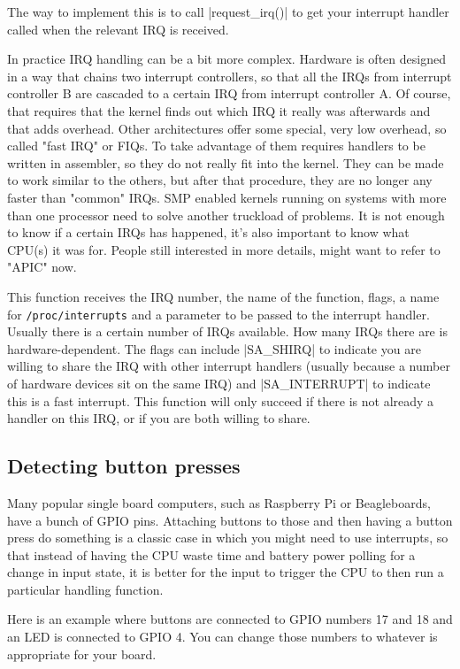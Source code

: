 \documentclass[10pt, oneside]{book}
\begin{document}
The way to implement this is to call \cpp|request_irq()| to get your interrupt handler called when the relevant IRQ is received.

In practice IRQ handling can be a bit more complex.
Hardware is often designed in a way that chains two interrupt controllers, so that all the IRQs from interrupt controller B are cascaded to a certain IRQ from interrupt controller A.
Of course, that requires that the kernel finds out which IRQ it really was afterwards and that adds overhead. Other architectures offer some special, very low overhead, so called "fast IRQ" or FIQs.
To take advantage of them requires handlers to be written in assembler, so they do not really fit into the kernel.
They can be made to work similar to the others, but after that procedure, they are no longer any faster than "common" IRQs.
SMP enabled kernels running on systems with more than one processor need to solve another truckload of problems.
It is not enough to know if a certain IRQs has happened, it's also important to know what CPU(s) it was for.
People still interested in more details, might want to refer to "APIC" now.

This function receives the IRQ number, the name of the function, flags, a name for \verb|/proc/interrupts| and a parameter to be passed to the interrupt handler.
Usually there is a certain number of IRQs available.
How many IRQs there are is hardware-dependent.
The flags can include \cpp|SA_SHIRQ| to indicate you are willing to share the IRQ with other interrupt handlers (usually because a number of hardware devices sit on the same IRQ) and \cpp|SA_INTERRUPT| to indicate this is a fast interrupt.
This function will only succeed if there is not already a handler on this IRQ, or if you are both willing to share.

\subsection{Detecting button presses}
\label{sec:detect_button}
Many popular single board computers, such as Raspberry Pi or Beagleboards, have a bunch of GPIO pins.
Attaching buttons to those and then having a button press do something is a classic case in which you might need to use interrupts,
so that instead of having the CPU waste time and battery power polling for a change in input state, it is better for the input to trigger the CPU to then run a particular handling function.

Here is an example where buttons are connected to GPIO numbers 17 and 18 and an LED is connected to GPIO 4.
You can change those numbers to whatever is appropriate for your board.
\end{document}
